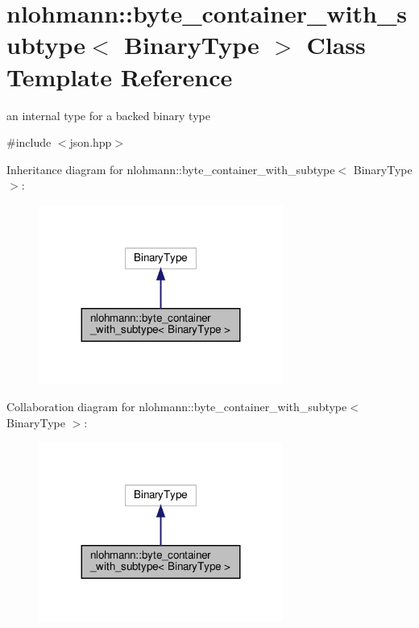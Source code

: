 \hypertarget{classnlohmann_1_1byte__container__with__subtype}{}\section{nlohmann\+:\+:byte\+\_\+container\+\_\+with\+\_\+subtype$<$ Binary\+Type $>$ Class Template Reference}
\label{classnlohmann_1_1byte__container__with__subtype}


an internal type for a backed binary type  




{\ttfamily \#include $<$json.\+hpp$>$}



Inheritance diagram for nlohmann\+:\+:byte\+\_\+container\+\_\+with\+\_\+subtype$<$ Binary\+Type $>$\+:
\nopagebreak
\begin{figure}[H]
\begin{center}
\leavevmode
\includegraphics[width=227pt]{classnlohmann_1_1byte__container__with__subtype__inherit__graph}
\end{center}
\end{figure}


Collaboration diagram for nlohmann\+:\+:byte\+\_\+container\+\_\+with\+\_\+subtype$<$ Binary\+Type $>$\+:
\nopagebreak
\begin{figure}[H]
\begin{center}
\leavevmode
\includegraphics[width=227pt]{classnlohmann_1_1byte__container__with__subtype__coll__graph}
\end{center}
\end{figure}
